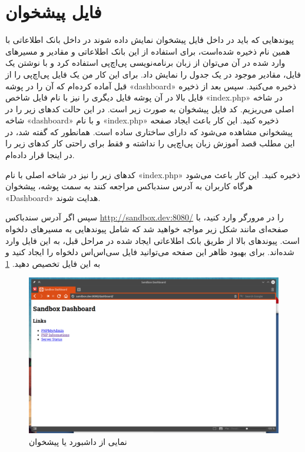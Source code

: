 \section{فایل پیشخوان}
پیوندهایی که باید در داخل فایل پیشخوان نمایش داده شوند در داخل بانک اطلاعاتی با همین نام ذخیره شده‌است، برای استفاده از این بانک اطلاعاتی و مقادیر و مسیرهای وارد شده در آن می‌توان از زبان برنامه‌نویسی پی‌اچ‌پی استفاده کرد و با نوشتن یک فایل، مقادیر موجود در یک جدول را نمایش داد. برای این کار من یک فایل پی‌اچ‌پی را از قبل آماده کرده‌ام که آن را در پوشه «dashboard» ذخیره می‌کنید. سپس بعد از ذخیره فایل بالا در آن پوشه فایل دیگری را نیز با نام فایل شاخص «index.php» در شاخه اصلی می‌ریزیم. کد فایل پیشخوان به صورت زیر است. در این حالت کدهای زیر را در شاخه «dashboard» و با نام «index.php» ذخیره کنید. این کار باعث ایجاد صفحه پیشخوانی مشاهده می‌شود که دارای ساختاری ساده است. همانطور که گفته شد، در این مطلب قصد آموزش زبان پی‌اچ‌پی را نداشته و فقط برای راحتی کار کدهای زیر را در اینجا قرار داده‌ام.
\newpage

\begin{latin}  
    
\end{latin}

کدهای زیر را نیز در شاخه اصلی با نام «index.php» ذخیره کنید. این کار باعث می‌شود هرگاه کاربران به آدرس سندباکس مراجعه کنند به سمت پوشه، پیشخوان «Dashboard» هدایت شوند.
\newline

\begin{latin}  
    
\end{latin}

سپس اگر آدرس سندباکس 
    \url{http://sandbox.dev:8080/}
را در مرورگر وارد کنید، با صفحه‌ای مانند شکل زیر مواجه خواهید شد که شامل پیوندهایی به مسیرهای دلخواه است. پیوندهای بالا از طریق بانک اطلاعاتی ایجاد شده در مراحل قبل، به این فایل وارد شده‌اند. برای بهبود ظاهر این صفحه می‌توانید فایل سی‌اس‌اس دلخواه را ایجاد کنید و به این فایل تخصیص دهید.
\ref{DASHBOARD}
\newline
\begin{figure}
    \includegraphics[width=.9\textwidth ,height=.60\textwidth]{Pic/Dashboard}
    \caption{ نمایی از داشبورد یا پیشخوان
    }
    \label{DASHBOARD}
\end{figure}